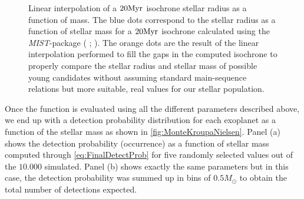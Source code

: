 \begin{figure}[!ht]
\centering
\caption{\scriptsize{Linear interpolation of a $20 \textnormal{Myr}$ isochrone stellar radius as a function of mass. The blue dots correspond to the stellar radius as a function of stellar mass for a $20 \textnormal{Myr}$ isochrone calculated using the \textit{MIST}-package ( \citeyear{2016ApJS..222....8D};  \citeyear{2016ApJ...823..102C}). The orange dots are the result of the linear interpolation performed to fill the gaps in the computed isochrone to properly compare the stellar radius and stellar mass of possible young candidates without assuming standard main-sequence relations but more suitable, real values for our stellar population.}}
\label{fig:RMInterpol}
\end{figure}

Once the function is evaluated using all the different parameters described above, we end up with a detection probability distribution for each exoplanet as a function of the stellar mass as shown in \autoref{fig:MonteKroupaNielsen}. Panel (a) shows the detection probability (occurrence) as a function of stellar mass computed through \autoref{eq:FinalDetectProb} for five randomly selected values out of the $10.000$ simulated. Panel (b) shows exactly the same parameters but in this case, the detection probability was summed up in bins of $0.5M_\odot$ to obtain the total number of detections expected.\\ 

